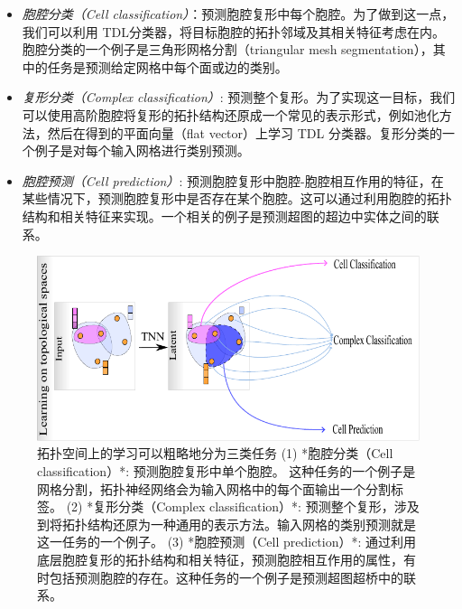 \documentclass[
  12pt,
]{krantz}
\providecommand{\tightlist}{%
  \setlength{\itemsep}{0pt}\setlength{\parskip}{0pt}}
\begin{document}
\begin{itemize}
\tightlist
\item
  \emph{胞腔分类（Cell
  classification）}：预测胞腔复形中每个胞腔。为了做到这一点，我们可以利用
  TDL分类器，将目标胞腔的拓扑邻域及其相关特征考虑在内。胞腔分类的一个例子是三角形网格分割（triangular
  mesh segmentation），其中的任务是预测给定网格中每个面或边的类别。
\item
  \emph{复形分类（Complex classification）}:
  预测整个复形。为了实现这一目标，我们可以使用高阶胞腔将复形的拓扑结构还原成一个常见的表示形式，例如池化方法，然后在得到的平面向量（flat
  vector）上学习 TDL
  分类器。复形分类的一个例子是对每个输入网格进行类别预测。
\item
  \emph{胞腔预测（Cell prediction）}:
  预测胞腔复形中胞腔-胞腔相互作用的特征，在某些情况下，预测胞腔复形中是否存在某个胞腔。这可以通过利用胞腔的拓扑结构和相关特征来实现。一个相关的例子是预测超图的超边中实体之间的联系。
\end{itemize}

\begin{figure}

{\centering \includegraphics{figures/tasks} 

}

\caption{拓扑空间上的学习可以粗略地分为三类任务 (1) *胞腔分类（Cell classification）*: 预测胞腔复形中单个胞腔。 这种任务的一个例子是网格分割，拓扑神经网络会为输入网格中的每个面输出一个分割标签。 (2) *复形分类（Complex classification）*: 预测整个复形，涉及到将拓扑结构还原为一种通用的表示方法。输入网格的类别预测就是这一任务的一个例子。 (3) *胞腔预测（Cell prediction）*: 通过利用底层胞腔复形的拓扑结构和相关特征，预测胞腔相互作用的属性，有时包括预测胞腔的存在。这种任务的一个例子是预测超图超桥中的联系。}\label{fig:tdl-tasks}
\end{figure}
\end{document}
